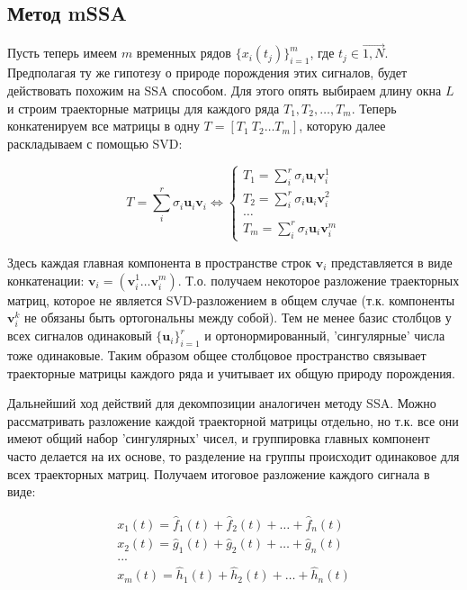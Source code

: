 	    	
			\subsection*{Метод mSSA}
			
			Пусть теперь имеем $ m $ временных рядов $ \{x_i(t_j)\}_{i = 1}^{m} $, где $ t_j \in \overrightarrow{1, N} $. Предполагая ту же гипотезу о природе порождения этих сигналов, будет действовать похожим на SSA способом. Для этого опять выбираем длину окна $ L $ и строим траекторные матрицы для каждого ряда $ T_1, T_2, \ldots , T_m  $. Теперь конкатенируем все матрицы в одну $ T = [T_1 \  T_2 \ldots T_m] $, которую далее раскладываем с помощью SVD:
			
			\begin{equation*}
				T = \sum\limits_i^{r} \sigma_i \mathbf{u}_i \mathbf{v}_i \Leftrightarrow \begin{cases}
					T_1 = \sum\limits_i^{r} \sigma_i \mathbf{u}_i \mathbf{v}_i^1 \\
					T_2 = \sum\limits_i^{r} \sigma_i \mathbf{u}_i \mathbf{v}_i^2 \\
					\ldots \\
					T_m = \sum\limits_i^{r} \sigma_i \mathbf{u}_i \mathbf{v}_i^m
				\end{cases}
			\end{equation*}
			
			Здесь каждая главная компонента в пространстве строк $ \mathbf{v}_i $ представляется в виде конкатенации: $ \mathbf{v}_i = (\mathbf{v}_i^1 \ldots \mathbf{v}_i^m) $. Т.о. получаем некоторое разложение траекторных матриц, которое не является SVD-разложением в общем случае (т.к. компоненты $ \mathbf{v}_i^k $ не обязаны быть ортогональны между собой). Тем не менее базис столбцов у всех сигналов одинаковый $ \{\mathbf{u}_i\}_{i=1}^r $ и ортонормированный, 'сингулярные' числа тоже одинаковые. Таким образом общее столбцовое пространство связывает траекторные матрицы каждого ряда и учитывает их общую природу порождения.
			
			Дальнейший ход действий для декомпозиции аналогичен методу SSA. Можно рассматривать разложение каждой траекторной матрицы отдельно, но т.к. все они имеют общий набор 'сингулярных' чисел, и группировка главных компонент часто делается на их основе, то разделение на группы происходит одинаковое для всех траекторных матриц. Получаем итоговое разложение каждого сигнала в виде:
			
			\begin{gather*}
				x_1(t) = \hat{f}_1(t) + \hat{f}_2(t) + \ldots + \hat{f}_{n}(t) \\
				x_2(t) = \hat{g}_1(t) + \hat{g}_2(t) + \ldots + \hat{g}_{n}(t) \\
				... \\
				x_m(t) = \hat{h}_1(t) + \hat{h}_2(t) + \ldots + \hat{h}_{n}(t)
			\end{gather*}
			

